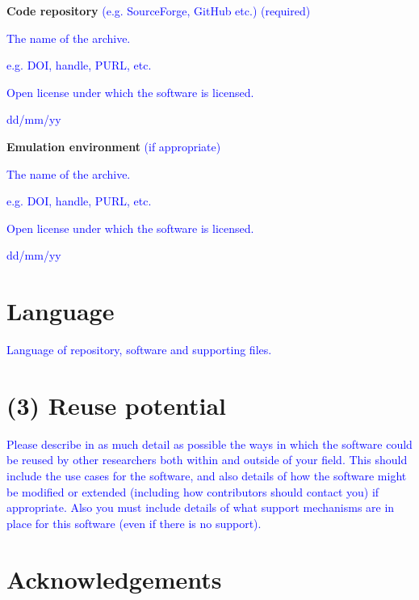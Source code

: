 \documentclass{jors}
\begin{document}
{\bf Code repository} \textcolor{blue}{(e.g. SourceForge, GitHub etc.) (required)}

\begin{description}[noitemsep,topsep=0pt]
	\item[Name:] \textcolor{blue}{The name of the archive.}
	\item[Persistent identifier:] \textcolor{blue}{e.g. DOI, handle, PURL, etc.}
	\item[Licence:] \textcolor{blue}{Open license under which the software is licensed.}
	\item[Date published:] \textcolor{blue}{dd/mm/yy}
\end{description}

{\bf Emulation environment} \textcolor{blue}{(if appropriate)}

\begin{description}[noitemsep,topsep=0pt]
	\item[Name:] \textcolor{blue}{The name of the archive.}
	\item[Persistent identifier:] \textcolor{blue}{e.g. DOI, handle, PURL, etc.}
	\item[Licence:] \textcolor{blue}{Open license under which the software is licensed.}
	\item[Date published:] \textcolor{blue}{dd/mm/yy}
\end{description}

\section*{Language}

\textcolor{blue}{Language of repository, software and supporting files.}

\section*{(3) Reuse potential}

\textcolor{blue}{Please describe in as much detail as possible the ways in which the software could be reused by other researchers both within and outside of your field. This should include the use cases for the software, and also details of how the software might be modified or extended (including how contributors should contact you) if appropriate. Also you must include details of what support mechanisms are in place for this software (even if there is no support).}

\section*{Acknowledgements}
\end{document}
